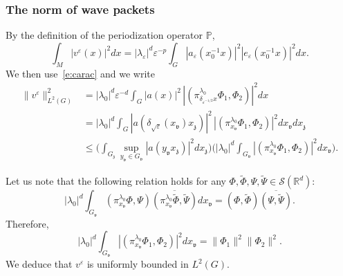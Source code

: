 \documentclass[10pt]{amsart}
\let\mathcal\mathscr
\theoremstyle{plain}
\theoremstyle{definition}
\let\eps\varepsilon
\def\R{{\mathbb R}}
\def\bbP{{\mathbb P}}
\begin{document}
\subsubsection{The norm of wave packets} \label{s:norm}
By the definition of the periodization operator $\bbP$,
\[
\int_M | v^\eps(x)|^2 dx= |\lambda_\eps|^{d} \eps^{-p}\int_{G} |a_\eps(x_0^{-1}x)|^2 |e_\eps(x_0^{-1}x) |^2dx.
\]
We then use~\eqref{e:carac} and we write
\begin{align*}
\| v^\eps\|^2_{L^2(G)}&= |\lambda_0|^d \eps^{-d}
\int_G |a(x)|^2\, |(\pi^{\lambda_0}_{\delta_{\eps^{-1/2}} x} \Phi_1,\Phi_2)|^2 dx\\
&= |\lambda_0|^d \int_G |a(\delta_{\sqrt\eps} (x_{\mathfrak v}) x_{\mathfrak z})|^2\, |(\pi^{\lambda_0}_{x_{\mathfrak v} }\Phi_1,\Phi_2)|^2 dx_{\mathfrak v} dx_{\mathfrak z}\\
&\leq\biggl(\int_{G_{\mathfrak z} } \sup_{y_{\mathfrak v} \in G_{\mathfrak v}} |a (y_{\mathfrak v} x_{\mathfrak z})|^2 dx_{\mathfrak z} \biggr)
\biggl(|\lambda_0|^d \int_{G_{\mathfrak v}}|(\pi^{\lambda_0}_{x_{\mathfrak v}} \Phi_1, \Phi_2)|^2 dx_{\mathfrak v}\biggr).
\end{align*}

Let us note that the following relation holds for any $\Phi, \widetilde{\Phi},\Psi,\widetilde{\Psi}\in \mathcal S(\R^d)$:
\begin{equation} \label{e:intPhi}
|\lambda_0|^d \int_{G_{\mathfrak{v}}} (\pi_{x_{\mathfrak v}}^{\lambda_0}\Phi,\Psi)\overline{ (\pi_{x_{\mathfrak v}}^{\lambda_0}\widetilde{\Phi},\widetilde{\Psi})}dx_{\mathfrak v} = (\Phi,\widetilde{\Phi})\overline{(\Psi,\widetilde{\Psi})}.
\end{equation}
Therefore,
\[
|\lambda_0|^d \int_{G_{\mathfrak v}}|(\pi^{\lambda_0}_{x_{\mathfrak v}} \Phi_1, \Phi_2)|^2 dx_{\mathfrak v}=\| \Phi_1\|^2 \| \Phi_2\|^2.
\]
We deduce that $v^\eps$ is uniformly bounded in $L^2(G)$.
\end{document}

